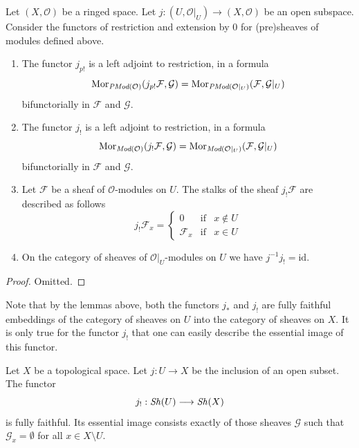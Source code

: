 \begin{lemma}
\label{lemma-j-shriek-modules}
Let $(X, \mathcal{O})$ be a ringed space.
Let $j : (U, \mathcal{O}|_U) \to (X, \mathcal{O})$
be an open subspace.
Consider the functors of restriction and extension
by $0$ for (pre)sheaves of modules defined above.
\begin{enumerate}
\item The functor $j_{p!}$ is a left adjoint to restriction,
in a formula
$$
\mathop{\mathrm{Mor}}\nolimits_{\textit{PMod}(\mathcal{O})}(j_{p!}\mathcal{F}, \mathcal{G})
=
\mathop{\mathrm{Mor}}\nolimits_{\textit{PMod}(\mathcal{O}|_U)}(\mathcal{F}, \mathcal{G}|_U)
$$
bifunctorially in $\mathcal{F}$ and $\mathcal{G}$.
\item The functor $j_!$ is a left adjoint to restriction,
in a formula
$$
\mathop{\mathrm{Mor}}\nolimits_{\textit{Mod}(\mathcal{O})}(j_!\mathcal{F}, \mathcal{G})
=
\mathop{\mathrm{Mor}}\nolimits_{\textit{Mod}(\mathcal{O}|_U)}(\mathcal{F}, \mathcal{G}|_U)
$$
bifunctorially in $\mathcal{F}$ and $\mathcal{G}$.
\item Let $\mathcal{F}$ be a sheaf of $\mathcal{O}$-modules on $U$.
The stalks of the sheaf $j_!\mathcal{F}$ are described
as follows
$$
j_{!}\mathcal{F}_x =
\left\{
\begin{matrix}
0 & \text{if} & x \not \in U \\
\mathcal{F}_x & \text{if} & x \in U
\end{matrix}
\right.
$$
\item On the category of sheaves of $\mathcal{O}|_U$-modules on $U$
we have $j^{-1}j_! = \text{id}$.
\end{enumerate}
\end{lemma}

\begin{proof}
Omitted.
\end{proof}

\noindent
Note that by the lemmas above, both the functors
$j_*$ and $j_!$ are fully faithful embeddings of
the category of sheaves on $U$ into the category
of sheaves on $X$. It is only true for the functor
$j_!$ that one can easily describe the essential
image of this functor.

\begin{lemma}
\label{lemma-equivalence-categories-open}
Let $X$ be a topological space.
Let $j : U \to X$ be the inclusion of an open subset.
The functor
$$
j_! : \mathop{\mathit{Sh}}\nolimits(U) \longrightarrow \mathop{\mathit{Sh}}\nolimits(X)
$$
is fully faithful. Its essential image consists exactly
of those sheaves $\mathcal{G}$ such that
$\mathcal{G}_x = \emptyset$ for all $x \in X \setminus U$.
\end{lemma}

